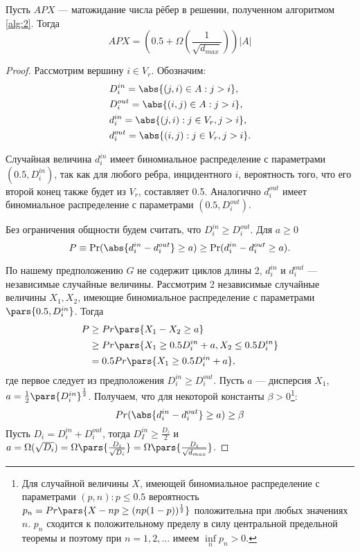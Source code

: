 \documentclass[a4paper, 12pt, oneside]{extarticle}  %
\begin{document}
\begin{theorem}\label{th:3}
  Пусть $APX$ --- матожидание числа рёбер в решении, полученном алгоритмом \ref{alg:2}. Тогда
  \[APX = \left(0.5 + \Omega\left(\frac{1}{\sqrt{d_{max}}}\right)\right)|A|\]
\end{theorem}
\begin{proof}
  Рассмотрим вершину $i\in V_r$. Обозначим:
  \begin{align*}
     & D_{i}^{in} = \abs{(j, i) \in A: j > i},       \\
     & D_{i}^{out} = \abs{(i, j) \in A: j > i},      \\
     & d_{i}^{in} = \abs{(j, i): j \in V_r, j > i},  \\
     & d_{i}^{out} = \abs{(i, j): j \in V_r, j > i}.
  \end{align*}

  Случайная величина $d_{i}^{in}$ имеет биномиальное распределение с параметрами $(0.5, D_{i}^{in})$, так как для любого ребра, инцидентного $i$, вероятность того, что его второй конец также будет из $V_r$, составляет 0.5. Аналогично $d_{i}^{out}$ имеет биномиальное распределение с параметрами $(0.5, D_{i}^{out})$.

  Без ограничения общности будем считать, что $D_{i}^{in} \ge D_{i}^{out}$. Для $a \ge 0$
  \[
    P \equiv \text{Pr}(\abs{d_{i}^{in} - d_{i}^{out}} \ge a) \ge \text{Pr}(d_{i}^{in} - d_{i}^{out} \ge a).
  \]

  По нашему предположению $G$ не содержит циклов длины 2, $d_{i}^{in}$ и $d_{i}^{out}$ --- независимые случайные величины. Рассмотрим 2 независимые случайные величины $X_1, X_2$, имеющие биномиальное распределение с параметрами $\pars{0.5, D_{i}^{in}}$. Тогда
  \begin{align*}
    P & \ge Pr\pars{X_1 - X_2 \ge a}
    \\
      & \ge Pr\pars{X_1 \ge 0.5D_{i}^{in} + a, X_2 \le 0.5D_{i}^{in}}
    \\
      & = 0.5Pr\pars{X_1 \ge 0.5D_{i}^{in} + a},
  \end{align*}
  где первое следует из предположения $D_{i}^{in} \ge D_{i}^{out}$. Пусть $a$ --- дисперсия $X_1$, $a = \frac{1}{2}\pars{D_{i}^{in}}^{\frac{1}{2}}$. Получаем, что для некоторой константы $\beta > 0$\footnote{Для случайной величины $X$, имеющей биномиальное распределение с параметрами $(p, n): p \le 0.5$ вероятность $p_n = Pr\pars{X - np \ge (np(1-p))^{\frac{1}{2}}}$ положительна при любых значениях $n$. $p_n$ сходится к положительному пределу в силу центральной предельной теоремы и поэтому при $ n = 1, 2, \ldots$ имеем $\inf\limits_{n} p_n > 0$.}:
  \[Pr(\abs{d_{i}^{in} - d_{i}^{out}} \ge a) \ge \beta\]
  Пусть $D_i = D_i^{in} + D_i^{out}$, тогда $D_I^{in} \ge \frac{D_i}{2}$ и $a = \Omega(\sqrt{D_i}) = \Omega \pars{\frac{D_i}{\sqrt{D_i}}} = \Omega \pars{\frac{D_i}{\sqrt{d_{max}}}}$.


\end{proof}
\end{document}
